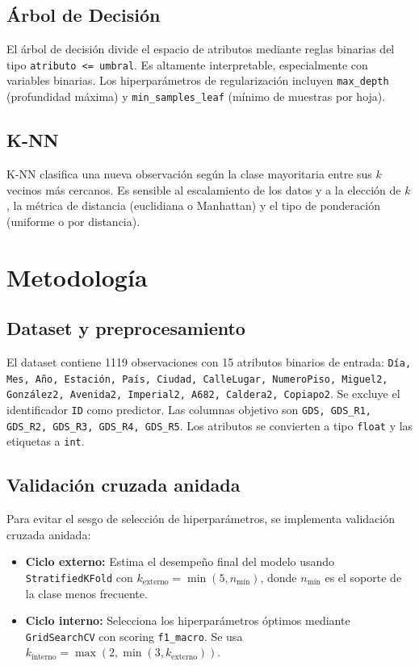 \documentclass[conference]{IEEEtran}
\begin{document}
\subsection{Árbol de Decisión}
El árbol de decisión divide el espacio de atributos mediante reglas binarias del tipo \texttt{atributo <= umbral}. Es altamente interpretable, especialmente con variables binarias. Los hiperparámetros de regularización incluyen \texttt{max\_depth} (profundidad máxima) y \texttt{min\_samples\_leaf} (mínimo de muestras por hoja).

\subsection{K-NN}
K-NN clasifica una nueva observación según la clase mayoritaria entre sus \(k\) vecinos más cercanos. Es sensible al escalamiento de los datos y a la elección de \(k\), la métrica de distancia (euclidiana o Manhattan) y el tipo de ponderación (uniforme o por distancia).

\section{Metodología}

\subsection{Dataset y preprocesamiento}
El dataset contiene 1119 observaciones con 15 atributos binarios de entrada: \texttt{Día, Mes, Año, Estación, País, Ciudad, CalleLugar, NumeroPiso, Miguel2, González2, Avenida2, Imperial2, A682, Caldera2, Copiapo2}. Se excluye el identificador \texttt{ID} como predictor. Las columnas objetivo son \texttt{GDS, GDS\_R1, GDS\_R2, GDS\_R3, GDS\_R4, GDS\_R5}. Los atributos se convierten a tipo \texttt{float} y las etiquetas a \texttt{int}.

\subsection{Validación cruzada anidada}
Para evitar el sesgo de selección de hiperparámetros, se implementa validación cruzada anidada:

\begin{itemize}
  \item \textbf{Ciclo externo:} Estima el desempeño final del modelo usando \texttt{StratifiedKFold} con \(k_{\text{externo}} = \min(5, n_{\text{mín}})\), donde \(n_{\text{mín}}\) es el soporte de la clase menos frecuente.
  \item \textbf{Ciclo interno:} Selecciona los hiperparámetros óptimos mediante \texttt{GridSearchCV} con scoring \texttt{f1\_macro}. Se usa \(k_{\text{interno}} = \max(2, \min(3, k_{\text{externo}}))\).
\end{itemize}
\end{document}
